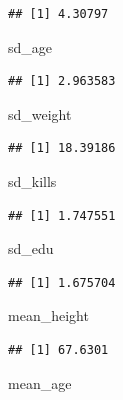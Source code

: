 \documentclass[]{article}
\newenvironment{Shaded}{\begin{snugshade}}{\end{snugshade}}
\newcommand{\NormalTok}[1]{#1}
\begin{document}
\begin{verbatim}
## [1] 4.30797
\end{verbatim}

\begin{Shaded}
\begin{Highlighting}[]
\NormalTok{sd_age}
\end{Highlighting}
\end{Shaded}

\begin{verbatim}
## [1] 2.963583
\end{verbatim}

\begin{Shaded}
\begin{Highlighting}[]
\NormalTok{sd_weight}
\end{Highlighting}
\end{Shaded}

\begin{verbatim}
## [1] 18.39186
\end{verbatim}

\begin{Shaded}
\begin{Highlighting}[]
\NormalTok{sd_kills}
\end{Highlighting}
\end{Shaded}

\begin{verbatim}
## [1] 1.747551
\end{verbatim}

\begin{Shaded}
\begin{Highlighting}[]
\NormalTok{sd_edu}
\end{Highlighting}
\end{Shaded}

\begin{verbatim}
## [1] 1.675704
\end{verbatim}

\begin{Shaded}
\begin{Highlighting}[]
\NormalTok{mean_height}
\end{Highlighting}
\end{Shaded}

\begin{verbatim}
## [1] 67.6301
\end{verbatim}

\begin{Shaded}
\begin{Highlighting}[]
\NormalTok{mean_age}
\end{Highlighting}
\end{Shaded}
\end{document}
